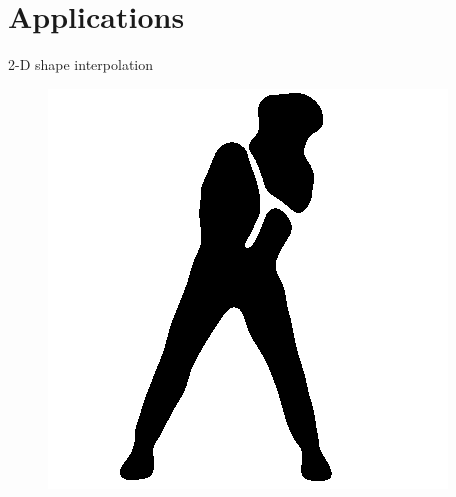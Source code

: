 \section{Applications}

\begin{frame}{2-D shape interpolation}
    \vspace{-1.2em}
    \begin{figure}
        \centering
        \captionsetup{font=scriptsize}
        \begin{minipage}[t]{0.08\linewidth}
            \vspace{0pt}
            \centering
            \includegraphics[width=\textwidth]{png/kun-chicken/color0.png}
        \end{minipage}
        \hfill
        \begin{minipage}[t]{0.08\linewidth}
            \vspace{0pt}
            \centering

\end{minipage}
\end{figure}
\end{frame}

